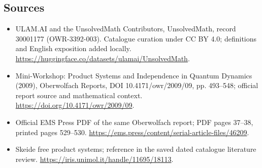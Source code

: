 \documentclass[11pt]{article}
\begin{document}
\subsection{Sources}
\begin{itemize}
\item[\hypertarget{source:30001177:1}{S1}] ULAM.AI and the UnsolvedMath Contributors, UnsolvedMath, record 30001177 (OWR-3392-003). Catalogue curation under CC BY 4.0; definitions and English exposition added locally.
\url{https://huggingface.co/datasets/ulamai/UnsolvedMath}.
\item[\hypertarget{source:30001177:2}{S2}] Mini-Workshop: Product Systems and Independence in Quantum Dynamics (2009), Oberwolfach Reports, DOI 10.4171/owr/2009/09, pp. 493--548; official report source and mathematical context.
\url{https://doi.org/10.4171/owr/2009/09}.
\item[\hypertarget{source:30001177:3}{S3}] Official EMS Press PDF of the same Oberwolfach report; PDF pages 37--38, printed pages 529--530.
\url{https://ems.press/content/serial-article-files/46209}.
\item[\hypertarget{source:30001177:4}{S4}] Skeide free product systems; reference in the saved dated catalogue literature review.
\url{https://iris.unimol.it/handle/11695/18113}.
\end{itemize}
\label{end:30001177}
\end{document}
